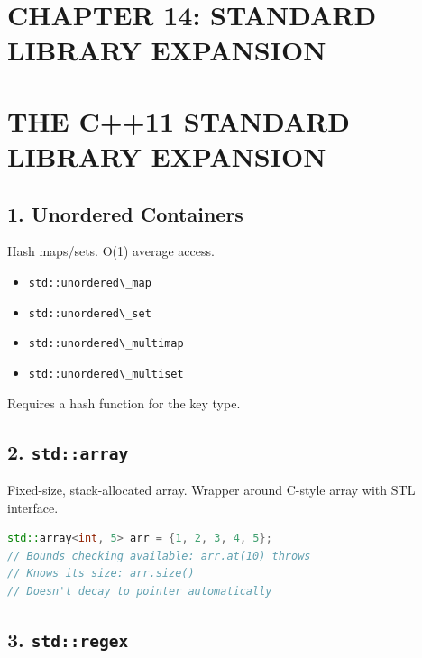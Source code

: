 \hypertarget{chapter-14-standard-library-expansion}{%
\section{CHAPTER 14: STANDARD LIBRARY
EXPANSION}\label{chapter-14-standard-library-expansion}}

\hypertarget{the-c11-standard-library-expansion}{%
\section{THE C++11 STANDARD LIBRARY
EXPANSION}\label{the-c11-standard-library-expansion}}

\hypertarget{unordered-containers}{%
\subsection{1. Unordered Containers}\label{unordered-containers}}

Hash maps/sets. O(1) average access.

\begin{itemize}
\tightlist
\item
  \passthrough{\lstinline!std::unordered\_map!}
\item
  \passthrough{\lstinline!std::unordered\_set!}
\item
  \passthrough{\lstinline!std::unordered\_multimap!}
\item
  \passthrough{\lstinline!std::unordered\_multiset!}
\end{itemize}

Requires a hash function for the key type.

\hypertarget{stdarray}{%
\subsection{\texorpdfstring{2.
\texttt{std::array}}{2. std::array}}\label{stdarray}}

Fixed-size, stack-allocated array. Wrapper around C-style array with STL
interface.

\begin{lstlisting}[language={C++}]
std::array<int, 5> arr = {1, 2, 3, 4, 5};
// Bounds checking available: arr.at(10) throws
// Knows its size: arr.size()
// Doesn't decay to pointer automatically
\end{lstlisting}

\hypertarget{stdregex}{%
\subsection{\texorpdfstring{3.
\texttt{std::regex}}{3. std::regex}}\label{stdregex}}

